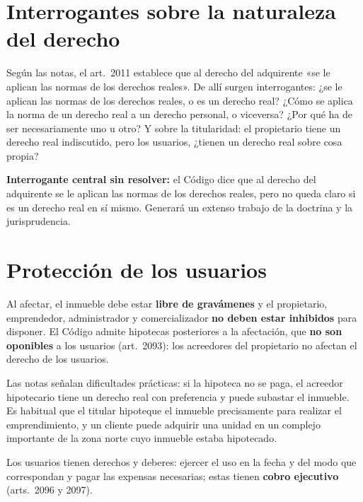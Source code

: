 \documentclass[12pt,oneside]{book}
\begin{document}
\section{Interrogantes sobre la naturaleza del derecho}

Según las notas, el art.~2011 establece que al derecho del adquirente «se le aplican las normas de los derechos reales». %
De allí surgen interrogantes: ¿se le aplican las normas de los derechos reales, o es un derecho real? ¿Cómo se aplica la norma de un derecho real a un derecho personal, o viceversa? ¿Por qué ha de ser necesariamente uno u otro? Y sobre la titularidad: el propietario tiene un derecho real indiscutido, pero los usuarios, ¿tienen un derecho real sobre cosa propia?

\begin{importante}
\textbf{Interrogante central sin resolver:} el Código dice que al derecho del adquirente se le aplican las normas de los derechos reales, pero no queda claro si es un derecho real en sí mismo. Generará un extenso trabajo de la doctrina y la jurisprudencia.
\end{importante}

\section{Protección de los usuarios}

Al afectar, el inmueble debe estar \textbf{libre de gravámenes} y el propietario, emprendedor, administrador y comercializador \textbf{no deben estar inhibidos} para disponer. El Código admite hipotecas posteriores a la afectación, que \textbf{no son oponibles} a los usuarios (art.~2093): los acreedores del propietario no afectan el derecho de los usuarios.

Las notas señalan dificultades prácticas: si la hipoteca no se paga, el acreedor hipotecario tiene un derecho real con preferencia y puede subastar el inmueble. Es habitual que el titular hipoteque el inmueble precisamente para realizar el emprendimiento, y un cliente puede adquirir una unidad en un complejo importante de la zona norte cuyo inmueble estaba hipotecado.

Los usuarios tienen derechos y deberes: ejercer el uso en la fecha y del modo que correspondan y pagar las expensas necesarias; estas tienen \textbf{cobro ejecutivo} (arts.~2096 y 2097).
\end{document}
